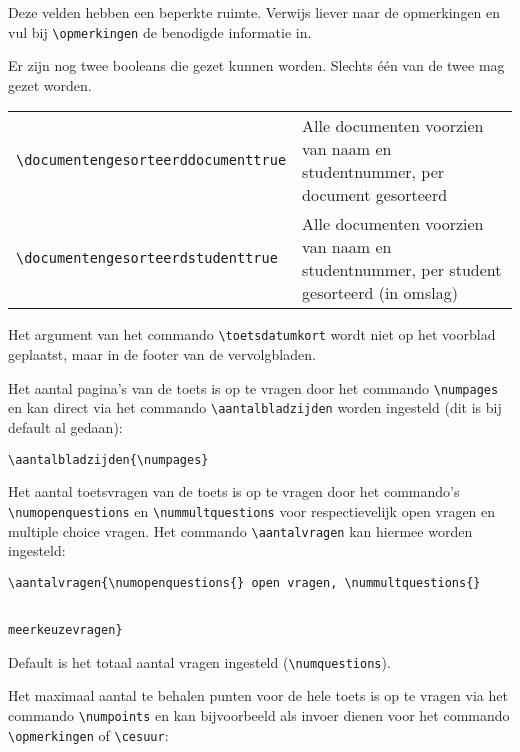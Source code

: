 \documentclass[dutch,a4paper,12pt,addpoints,fleqn,oneside]{tisdexam}
\begin{document}
\bigskip
Deze velden hebben een beperkte ruimte. Verwijs liever naar de opmerkingen en vul bij \verb|\opmerkingen|
de benodigde informatie in.

\bigskip
Er zijn nog twee booleans die gezet kunnen worden. Slechts \'e\'en van de twee mag gezet worden.

\bigskip
\begin{tabular}{lp{8cm}}
\verb|\documentengesorteerddocumenttrue| & Alle documenten voorzien van naam en studentnummer, per document gesorteerd \\
\verb|\documentengesorteerdstudenttrue| & Alle documenten voorzien van naam en studentnummer, per student gesorteerd (in omslag) \\
\end{tabular}


\medskip
Het argument van het commando \verb|\toetsdatumkort| wordt niet op het voorblad
geplaatst, maar in de footer van de vervolgbladen.

\medskip
Het aantal pagina's van de toets is op te vragen door het commando \verb|\numpages| en
kan direct via het commando \verb|\aantalbladzijden| worden ingesteld (dit is bij default
al gedaan):

\bigskip
\verb|\aantalbladzijden{\numpages}|

\bigskip
Het aantal toetsvragen van de toets is op te vragen door het commando's \verb|\numopenquestions| en
\verb|\nummultquestions| voor respectievelijk open vragen en multiple choice vragen.
Het commando \verb|\aantalvragen| kan hiermee worden ingesteld:

\bigskip
\verb|\aantalvragen{\numopenquestions{} open vragen, \nummultquestions{}|

\verb|                                                       meerkeuzevragen}|

Default is het totaal aantal vragen ingesteld (\verb|\numquestions|).


\bigskip
Het maximaal aantal te behalen punten voor de hele toets is op te vragen via het commando
\verb|\numpoints| en kan bijvoorbeeld als invoer dienen voor het commando \verb|\opmerkingen| of
\verb|\cesuur|:
\end{document}

